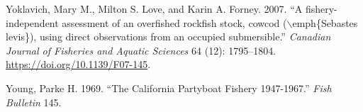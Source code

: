 \documentclass[
  english,
  a4paper,
]{article}
\newlength{\cslhangindent}
\newlength{\cslentryspacingunit} %
\newenvironment{CSLReferences}[2] %
 {%
  \setlength{\parindent}{0pt}
  \ifodd #1
  \let\oldpar\par
  \def\par{\hangindent=\cslhangindent\oldpar}
  \fi
  \setlength{\parskip}{#2\cslentryspacingunit}
 }%
 {}
\begin{document}
\begin{CSLReferences}{1}{0}
\leavevmode{}%
Yoklavich, Mary M., Milton S. Love, and Karin A. Forney. 2007. {``{A fishery-independent assessment of an overfished rockfish stock, cowcod (\(\backslash\)emph{\{}Sebastes levis{\}}), using direct observations from an occupied submersible}.''} \emph{Canadian Journal of Fisheries and Aquatic Sciences} 64 (12): 1795--1804. \url{https://doi.org/10.1139/F07-145}.

\leavevmode{}%
Young, Parke H. 1969. {``{The California Partyboat Fishery 1947-1967}.''} \emph{Fish Bulletin} 145.

\end{CSLReferences}
\end{document}
